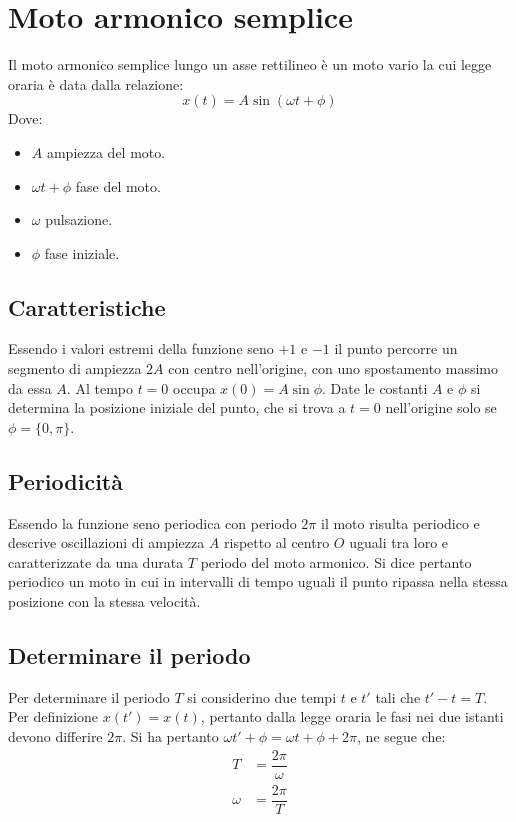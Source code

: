 \documentclass[class=book, crop=false, oneside, 12pt]{standalone}
\begin{document}
\section{Moto armonico semplice}
Il moto armonico semplice lungo un asse rettilineo \`e un moto vario la cui legge oraria \`e data dalla relazione:
$$x(t) = A \sin(\omega t + \phi)$$
Dove:
\begin{multicols}{2}
	\begin{itemize}
		\item $A$ ampiezza del moto.
		\item $\omega t + \phi$ fase del moto.
		\item $\omega$ pulsazione.
		\item $\phi$ fase iniziale.
	\end{itemize}
\end{multicols}
	\subsection{Caratteristiche}
	Essendo i valori estremi della funzione seno $+1$ e $-1$ il punto percorre un segmento di ampiezza $2A$ con centro nell'origine, con uno spostamento massimo da essa $A$.
	Al tempo $t=0$ occupa $x(0)=A\sin\phi$.
	Date le costanti $A$ e $\phi$ si determina la posizione iniziale del punto, che si trova a $t=0$ nell'origine solo se $\phi=\{0, \pi\}$.
	\subsection{Periodicit\`a}
	Essendo la funzione seno periodica con periodo $2\pi$ il moto risulta periodico e descrive oscillazioni di ampiezza $A$ rispetto al centro $O$ uguali tra loro e caratterizzate da una durata $T$ periodo del moto armonico.
	Si dice pertanto periodico un moto in cui in intervalli di tempo uguali il punto ripassa nella stessa posizione con la stessa velocit\`a.
	\subsection{Determinare il periodo}
	Per determinare il periodo $T$ si considerino due tempi $t$ e $t'$ tali che $t'-t = T$.
	Per definizione $x(t')=x(t)$, pertanto dalla legge oraria le fasi nei due istanti devono differire $2\pi$.
	Si ha pertanto $\omega t' +\phi = \omega t + \phi + 2\pi$, ne segue che:
	\begin{align*}
		T &= \dfrac{2\pi}{\omega}\\
		\omega &=\dfrac{2\pi}{T}
	\end{align*}
\end{document}
